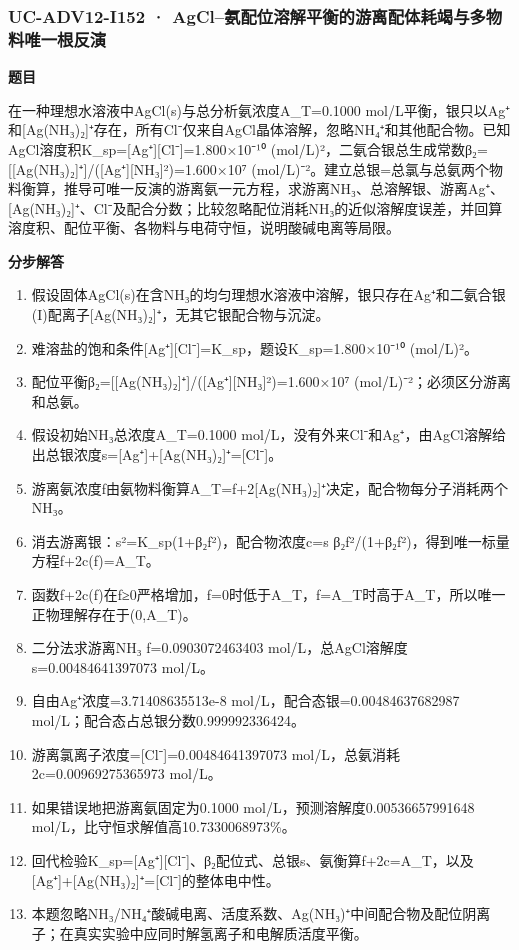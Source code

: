 \documentclass[UTF8,11pt,a4paper]{ctexart}
\begin{document}
\subsubsection*{UC-ADV12-I152 · AgCl–氨配位溶解平衡的游离配体耗竭与多物料唯一根反演}
\noindent\textbf{题目}\par
在一种理想水溶液中AgCl(s)与总分析氨浓度A\_T=0.1000 mol/L平衡，银只以Ag⁺和[Ag(NH₃)₂]⁺存在，所有Cl⁻仅来自AgCl晶体溶解，忽略NH₄⁺和其他配合物。已知AgCl溶度积K\_sp=[Ag⁺][Cl⁻]=1.800×10⁻¹⁰ (mol/L)²，二氨合银总生成常数β₂=[[Ag(NH₃)₂]⁺]/([Ag⁺][NH₃]²)=1.600×10⁷ (mol/L)⁻²。建立总银=总氯与总氨两个物料衡算，推导可唯一反演的游离氨一元方程，求游离NH₃、总溶解银、游离Ag⁺、[Ag(NH₃)₂]⁺、Cl⁻及配合分数；比较忽略配位消耗NH₃的近似溶解度误差，并回算溶度积、配位平衡、各物料与电荷守恒，说明酸碱电离等局限。\par
\medskip\noindent\textbf{分步解答}
\begin{enumerate}
\item 假设固体AgCl(s)在含NH₃的均匀理想水溶液中溶解，银只存在Ag⁺和二氨合银(I)配离子[Ag(NH₃)₂]⁺，无其它银配合物与沉淀。
\item 难溶盐的饱和条件[Ag⁺][Cl⁻]=K\_sp，题设K\_sp=1.800×10⁻¹⁰ (mol/L)²。
\item 配位平衡β₂=[[Ag(NH₃)₂]⁺]/([Ag⁺][NH₃]²)=1.600×10⁷ (mol/L)⁻²；必须区分游离和总氨。
\item 假设初始NH₃总浓度A\_T=0.1000 mol/L，没有外来Cl⁻和Ag⁺，由AgCl溶解给出总银浓度s=[Ag⁺]+[Ag(NH₃)₂]⁺=[Cl⁻]。
\item 游离氨浓度f由氨物料衡算A\_T=f+2[Ag(NH₃)₂]⁺决定，配合物每分子消耗两个NH₃。
\item 消去游离银：s²=K\_sp(1+β₂f²)，配合物浓度c=s β₂f²/(1+β₂f²)，得到唯一标量方程f+2c(f)=A\_T。
\item 函数f+2c(f)在f≥0严格增加，f=0时低于A\_T，f=A\_T时高于A\_T，所以唯一正物理解存在于(0,A\_T)。
\item 二分法求游离NH₃ f=0.0903072463403 mol/L，总AgCl溶解度s=0.00484641397073 mol/L。
\item 自由Ag⁺浓度=3.71408635513e-8 mol/L，配合态银=0.00484637682987 mol/L；配合态占总银分数0.999992336424。
\item 游离氯离子浓度=[Cl⁻]=0.00484641397073 mol/L，总氨消耗2c=0.00969275365973 mol/L。
\item 如果错误地把游离氨固定为0.1000 mol/L，预测溶解度0.00536657991648 mol/L，比守恒求解值高10.7330068973\%。
\item 回代检验K\_sp=[Ag⁺][Cl⁻]、β₂配位式、总银s、氨衡算f+2c=A\_T，以及[Ag⁺]+[Ag(NH₃)₂]⁺=[Cl⁻]的整体电中性。
\item 本题忽略NH₃/NH₄⁺酸碱电离、活度系数、Ag(NH₃)⁺中间配合物及配位阴离子；在真实实验中应同时解氢离子和电解质活度平衡。
\end{enumerate}
\end{document}
